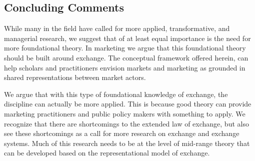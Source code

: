 \subsection{Concluding Comments}
While many in the field have called for more applied, transformative, and managerial research, we suggest that of at least equal importance is the need for more foundational theory. In marketing we argue that this foundational theory should be built around exchange. The conceptual framework offered herein, can help scholars and practitioners envision markets and marketing as grounded in shared representations between market actors. 
	
We argue that with this type of foundational knowledge of exchange, the discipline can actually be more applied. This is because good theory can provide marketing practitioners and public policy makers with something to apply. We recognize that there are shortcomings to the extended law of exchange, but also see these shortcomings as a call for more research on exchange and exchange systems. Much of this research needs to be at the level of mid-range theory that can be developed based on the representational model of exchange.
